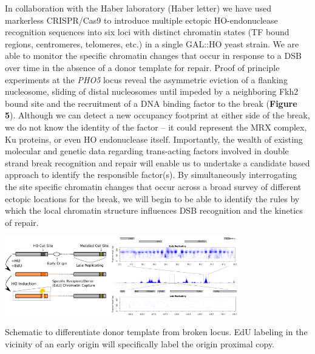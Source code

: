 In collaboration with the Haber laboratory (Haber letter) we have used markerless CRISPR/Cas9\cite{Dekker2017} to introduce multiple ectopic HO-endonuclease recognition sequences into six loci with distinct chromatin states (TF bound regions, centromeres, telomeres, etc.) in a single GAL::HO yeast strain.  %
We are able to %
monitor the specific chromatin changes that occur in response to a DSB over time in the absence of a donor template for repair.  Proof of principle experiments at the \textit{PHO5} locus reveal the asymmetric eviction of a flanking nucleosome, sliding of distal nucleosomes until impeded by a neighboring Fkh2 bound site and the recruitment of a DNA binding factor to the break ({\color{dukeblue}\textbf{Figure 5}}).  Although we can detect a new occupancy footprint at either side of the  break, we do not know the identity of the factor -- it could represent the MRX complex, Ku proteins, or even HO endonuclease itself. Importantly, the wealth of existing molecular and genetic data regarding trans-acting factors involved in double strand break recognition and repair %
will enable us to undertake a %
candidate based approach to identify the responsible factor(s).  By simultaneously interrogating the site specific chromatin changes that occur across a broad survey of different ectopic locations for the break, we will begin to be able to identify the rules by which the local chromatin structure influences DSB recognition and the kinetics of repair.
\begin{floatingfigure}[l]{4in}
\vspace{-7mm}
\begin{center}
\includegraphics[width=4in]{r35_figures/EdU_Schematic_9.png}
\end{center}
\vspace{4mm}
\caption{Schematic to differentiate donor template from broken locus. EdU labeling in the vicinity of an early origin will specifically label the origin proximal copy. }%
\end{floatingfigure}


